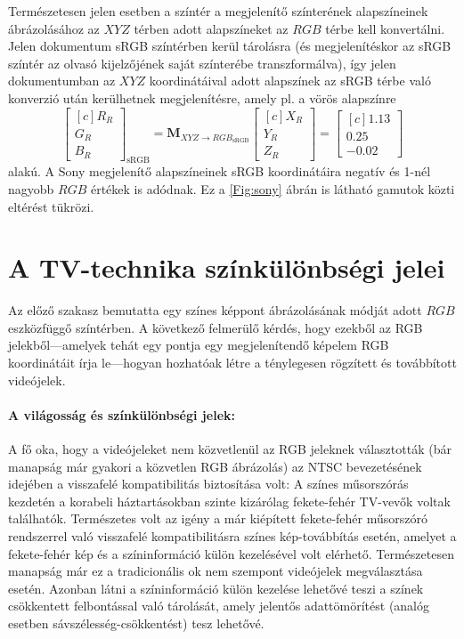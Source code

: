 Természetesen jelen esetben a színtér a megjelenítő színterének alapszíneinek ábrázolásához az $XYZ$ térben adott alapszíneket az $RGB$ térbe kell konvertálni.
Jelen dokumentum sRGB színtérben kerül tárolásra (és megjelenítéskor az sRGB színtér az olvasó kijelzőjének saját színterébe transzformálva), így jelen dokumentumban az $XYZ$ koordinátáival adott alapszínek az sRGB térbe való konverzió után kerülhetnek megjelenítésre, amely pl. a vörös alapszínre
\begin{equation}
\begin{bmatrix}[c]
       R_R \\[0.3em]
       G_R \\[0.3em]
       B_R \end{bmatrix}_{\mathrm{sRGB}}
       =
     \mathbf{M}_{X\!Y\!Z \rightarrow R\!G\!B_{\mathrm{sRGB}}}
      \begin{bmatrix}[c]
       X_R \\[0.3em]
       Y_R \\[0.3em]
       Z_R \end{bmatrix} =      
       \begin{bmatrix}[c]
       1.13 \\[0.3em]
       0.25 \\[0.3em]
       -0.02 \end{bmatrix} 
\end{equation}
alakú.
A Sony megjelenítő alapszíneinek sRGB koordinátáira negatív és 1-nél nagyobb $RGB$ értékek is adódnak.
Ez a \ref{Fig:sony} ábrán is látható gamutok közti eltérést tükrözi.

\section{A TV-technika színkülönbségi jelei}

Az előző szakasz bemutatta egy színes képpont ábrázolásának módját adott $RGB$ eszközfüggő színtérben.
A következő felmerülő kérdés, hogy ezekből az RGB jelekből---amelyek tehát egy pontja egy megjelenítendő képelem RGB koordinátáit írja le---hogyan hozhatóak létre a ténylegesen rögzített és továbbított videójelek.

\paragraph{A világosság és színkülönbségi jelek:\\}
A fő oka, hogy a videójeleket nem közvetlenül az RGB jeleknek választották (bár manapság már gyakori a közvetlen RGB ábrázolás) az NTSC bevezetésének idejében a visszafelé kompatibilitás biztosítása volt:
A színes műsorszórás kezdetén a korabeli háztartásokban szinte kizárólag fekete-fehér TV-vevők voltak találhatók.
Természetes volt az igény a már kiépített fekete-fehér műsorszóró rendszerrel való visszafelé kompatibilitásra színes kép-továbbítás esetén, amelyet a fekete-fehér kép és a színinformáció külön kezelésével volt elérhető.
Természetesen manapság már ez a tradicionális ok nem szempont videójelek megválasztása esetén.
Azonban látni a színinformáció külön kezelése lehetővé teszi a színek csökkentett felbontással való tárolását, amely jelentős adattömörítést (analóg esetben sávszélesség-csökkentést) tesz lehetővé.

